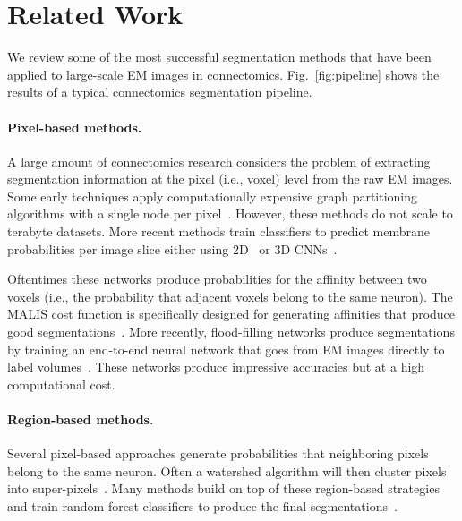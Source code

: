 \section{Related Work}

We review some of the most successful segmentation methods that have been applied to large-scale EM images in connectomics. Fig.~\ref{fig:pipeline} shows the results of a typical connectomics segmentation pipeline.

\paragraph{Pixel-based methods.}
A large amount of connectomics research considers the problem of extracting segmentation information at the pixel (i.e., voxel) level from the raw EM images. Some early techniques apply computationally expensive graph partitioning algorithms with a single node per pixel~\cite{andres2012globally}. However, these methods do not scale to terabyte datasets. More recent methods train classifiers to predict membrane probabilities per image slice either using 2D~\cite{ciresan2012deep,jain2010boundary,kaynig2015large,seymour2016rhoananet,amelio_segmentation} or 3D CNNs~\cite{lee2015recursive,ronneberger2015u,turaga2010convolutional}.

Oftentimes these networks produce probabilities for the affinity between two voxels (i.e., the probability that adjacent voxels belong to the same neuron). The MALIS cost function is specifically designed for generating affinities that produce good segmentations~\cite{briggman2009maximin}. More recently, flood-filling networks produce segmentations by training an end-to-end neural network that goes from EM images directly to label volumes~\cite{januszewski2016flood}. These networks produce impressive accuracies but at a high computational cost.

\paragraph{Region-based methods.}
Several pixel-based approaches generate probabilities that neighboring pixels belong to the same neuron.
Often a watershed algorithm will then cluster pixels into super-pixels~\cite{zlateski2015image}.
Many methods build on top of these region-based strategies and train random-forest classifiers to produce the final segmentations~\cite{seymour2016rhoananet,nunez2014graph,10.1371/journal.pone.0125825,parag2017anisotropic,zlateski2015image}.


